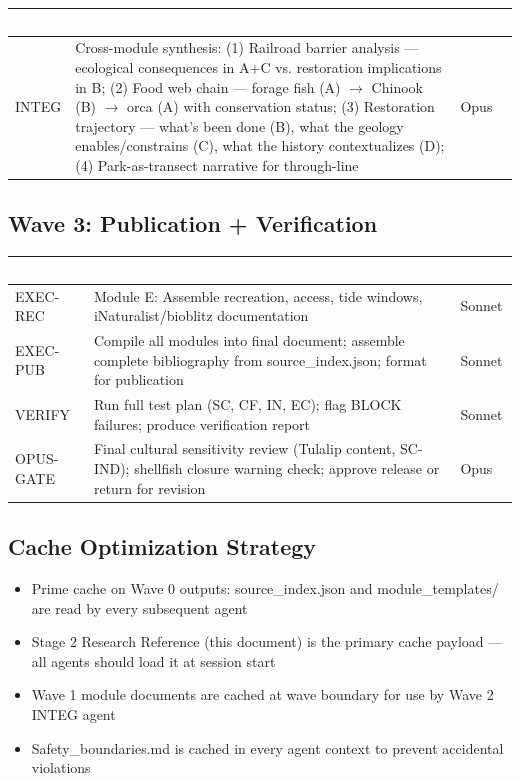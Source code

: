 \documentclass[11pt,letterpaper]{article}
\newcommand{\tableheader}[1]{\textbf{\sffamily\textcolor{white}{#1}}}
\begin{document}
\begin{center}
\begin{tabularx}{\textwidth}{L{2cm}XL{2cm}}
\toprule
{}
\tableheader{Agent} & \tableheader{Task} & \tableheader{Model} \\
\midrule
INTEG & Cross-module synthesis: (1) Railroad barrier analysis --- ecological consequences in A+C vs. restoration implications in B; (2) Food web chain --- forage fish (A) $\rightarrow$ Chinook (B) $\rightarrow$ orca (A) with conservation status; (3) Restoration trajectory --- what's been done (B), what the geology enables/constrains (C), what the history contextualizes (D); (4) Park-as-transect narrative for through-line & Opus \\
\bottomrule
\end{tabularx}
\end{center}

\subsection{Wave 3: Publication + Verification}

\begin{center}
\begin{tabularx}{\textwidth}{L{2cm}XL{2cm}}
\toprule
{}
\tableheader{Agent} & \tableheader{Task} & \tableheader{Model} \\
\midrule
EXEC-REC & Module E: Assemble recreation, access, tide windows, iNaturalist/bioblitz documentation & Sonnet \\
EXEC-PUB & Compile all modules into final document; assemble complete bibliography from source\_index.json; format for publication & Sonnet \\
VERIFY & Run full test plan (SC, CF, IN, EC); flag BLOCK failures; produce verification report & Sonnet \\
OPUS-GATE & Final cultural sensitivity review (Tulalip content, SC-IND); shellfish closure warning check; approve release or return for revision & Opus \\
\bottomrule
\end{tabularx}
\end{center}

\subsection{Cache Optimization Strategy}

\begin{itemize}
  \item Prime cache on Wave 0 outputs: source\_index.json and module\_templates/ are read by every subsequent agent
  \item Stage 2 Research Reference (this document) is the primary cache payload --- all agents should load it at session start
  \item Wave 1 module documents are cached at wave boundary for use by Wave 2 INTEG agent
  \item Safety\_boundaries.md is cached in every agent context to prevent accidental violations
\end{itemize}
\end{document}
